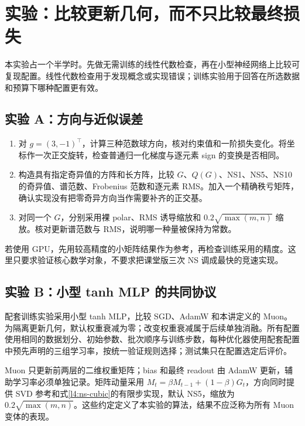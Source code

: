 \section{实验：比较更新几何，而不只比较最终损失}
\label{l4:lab}

本实验占一个半学时。先做无需训练的线性代数检查，再在小型神经网络上比较可复现配置。线性代数检查用于发现概念或实现错误；训练实验用于回答在所选数据和预算下哪种配置更有效。

\subsection{实验 A：方向与近似误差}

\begin{enumerate}
 \item 对 $g=(3,-1)^\top$，计算三种范数球方向，核对约束值和一阶损失变化。将坐标作一次正交旋转，检查普通归一化梯度与逐元素 sign 的变换是否相同。
 \item 构造具有指定奇异值的方阵和长方阵，比较 $G$、$Q(G)$、NS1、NS5、NS10 的奇异值、谱范数、Frobenius 范数和逐元素 RMS。加入一个精确秩亏矩阵，确认实现没有把零奇异方向当作需要补齐的正交基。
 \item 对同一个 $G$，分别采用裸 polar、RMS 诱导缩放和 $0.2\sqrt{\max(m,n)}$ 缩放。核对更新谱范数与 RMS，说明哪一种量被保持为常数。
\end{enumerate}

若使用 GPU，先用较高精度的小矩阵结果作为参考，再检查训练采用的精度。这里只要求验证核心数学对象，不要求把课堂版三次 NS 调成最快的竞速实现。

\subsection{实验 B：小型 tanh MLP 的共同协议}

配套训练实验采用小型 tanh MLP，比较 SGD、AdamW 和本讲定义的 Muon。为隔离更新几何，默认权重衰减为零；改变权重衰减属于后续单独消融。所有配置使用相同的数据划分、初始参数、批次顺序与训练步数，每种优化器使用配套配置中预先声明的三组学习率，按统一验证规则选择；测试集只在配置选定后评价。

Muon 只更新前两层的二维权重矩阵；bias 和最终 readout 由 AdamW 更新，辅助学习率必须单独记录。矩阵动量采用
$M_t=\beta M_{t-1}+(1-\beta)G_t$，方向同时提供 SVD 参考和式\eqref{l4:ns-cubic}的有限步实现，默认 NS5，缩放为 $0.2\sqrt{\max(m,n)}$。这些约定定义了本实验的算法，结果不应泛称为所有 Muon 变体的表现。

